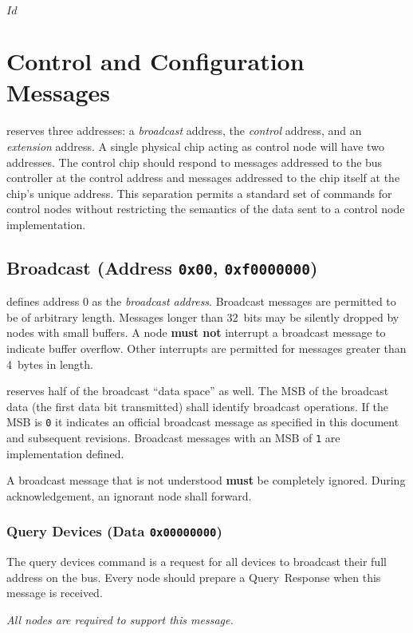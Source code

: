 \svnInfo $Id$

\section{Control and Configuration Messages}
\label{sec:control}

\bus reserves three addresses: a {\em broadcast} address, the {\em control}
address, and an {\em extension} address. A single physical chip acting as
control node will have two addresses. The control chip should respond to
messages addressed to the bus controller at the control address and messages
addressed to the chip itself at the chip's unique address. This separation
permits a standard set of commands for \bus control nodes without restricting
the semantics of the data sent to a control node implementation.

\subsection{Broadcast (Address \texttt{0x00}, \texttt{0xf0000000})}
\label{sec:control-broadcast}
\bus defines address 0 as the \textit{broadcast address}. Broadcast messages
are permitted to be of arbitrary length. Messages longer than 32~bits may be
silently dropped by nodes with small buffers. A node \textbf{must not}
interrupt a broadcast message to indicate buffer overflow. Other interrupts
are permitted for messages greater than 4~bytes in length.

\bus reserves half of the broadcast ``data space'' as well. The MSB of the
broadcast data (the first data bit transmitted) shall identify \bus broadcast
operations. If the MSB is {\tt 0} it indicates an official \bus broadcast
message as specified in this document and subsequent revisions. Broadcast
messages with an MSB of {\tt 1} are implementation defined.

A broadcast message that is not understood \textbf{must} be completely
ignored. During acknowledgement, an ignorant node shall forward.

\subsubsection{Query Devices (Data \texttt{0x00000000})}
The query devices command is a request for all devices to broadcast their full
address on the bus. Every \bus node should prepare a Query~Response when this
message is received.

\medskip
\noindent
\textit{All nodes are required to support this message.}

